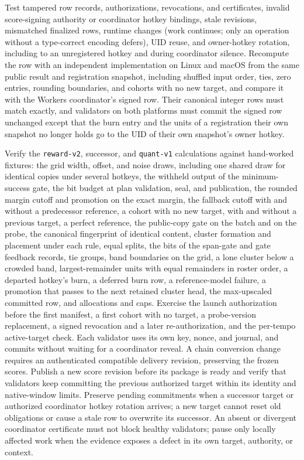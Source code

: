 Test tampered row records, authorizations, revocations, and certificates,
invalid score-signing authority or coordinator hotkey bindings, stale
revisions, mismatched finalized rows, runtime changes (work continues; only an
operation without a type-correct encoding defers), UID reuse, and owner-hotkey
rotation, including to an unregistered hotkey and during coordinator silence. Recompute the row with an
independent implementation on Linux and macOS from the same public result and
registration snapshot, including shuffled input order, ties, zero entries,
rounding boundaries, and cohorts with no new target, and compare it with the
Workers coordinator's signed row. Their canonical integer rows must match
exactly, and validators on both platforms must commit the signed row unchanged
except that the burn entry and the units of a registration their own snapshot
no longer holds go to the UID of their own snapshot's owner hotkey.

Verify the \texttt{reward-v2}, successor, and \texttt{quant-v1} calculations against
hand-worked fixtures: the grid width, offset, and noise draws, including one
shared draw for identical copies under several hotkeys, the withheld output of
the minimum-success gate, the bit budget at plan validation, seal, and
publication, the rounded margin cutoff and promotion on the exact margin, the
fallback cutoff with and without a
predecessor reference, a cohort with no new target, with and without a previous
target, a perfect reference, the public-copy gate on the batch and on the probe,
the canonical fingerprint of identical content, cluster formation and
placement under each rule, equal splits,
the bits of the span-gate and gate feedback records, tie groups, band boundaries on the grid, a lone cluster below a
crowded band, largest-remainder units with equal remainders in roster order,
a departed hotkey's burn, a deferred burn row, a reference-model failure, a
promotion that passes to the next retained cluster head, the max-upscaled committed row, and allocations and caps. Exercise the launch authorization
before the first manifest, a first cohort with no target, a probe-version
replacement, a signed revocation and a later re-authorization, and the
per-tempo active-target check. Each validator uses its own key,
nonce, and journal, and commits without waiting for a coordinator reveal. A chain
conversion change requires an authenticated compatible delivery revision,
preserving the frozen scores. Publish a new score revision before its package
is ready and verify that validators keep committing the previous authorized
target within its identity and native-window limits. Preserve pending commitments
when a successor target or authorized coordinator hotkey rotation arrives; a new target
cannot reset old obligations or cause a stale row to overwrite its successor.
An absent or divergent coordinator certificate must not block healthy validators;
pause only locally affected work when the evidence exposes a defect in its own
target, authority, or context.

